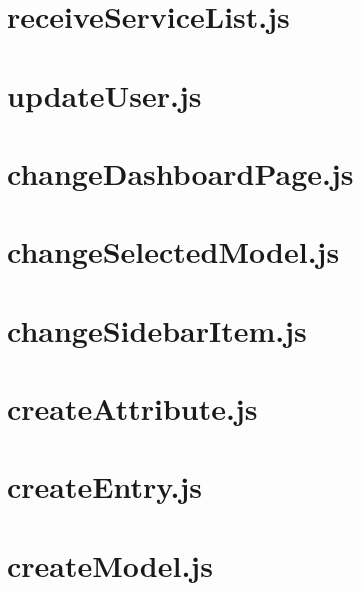 \documentclass[a4paper,landscape]{report}
\begin{document}
\newpage
\section{receiveServiceList.js}


\newpage
\section{updateUser.js}


\newpage
\section{changeDashboardPage.js}


\newpage
\section{changeSelectedModel.js}


\newpage
\section{changeSidebarItem.js}


\newpage
\section{createAttribute.js}


\newpage
\section{createEntry.js}


\newpage
\section{createModel.js}


\newpage
\end{document}
